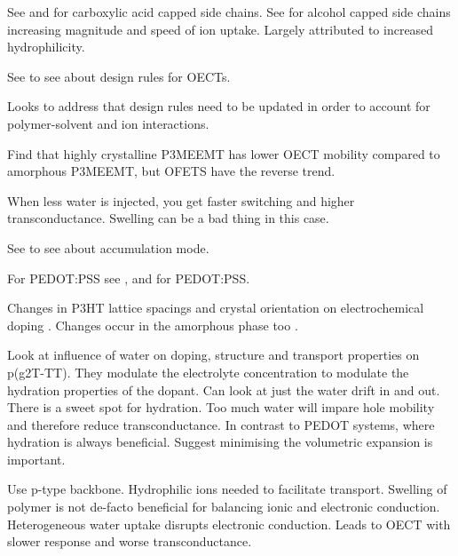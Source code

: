 \documentclass{article}
\begin{document}
See \cite{Laiho2011} and \cite{Toss2014} for carboxylic acid capped side chains.  See \cite{Pacheco-Moreno2017} for alcohol capped side chains increasing magnitude and speed of ion uptake. Largely attributed to increased hydrophilicity. 

See \cite{Paterson2018} to see about design rules for OECTs.

Looks to address that design rules need to be updated in order to account for polymer-solvent and ion interactions. 

Find that highly crystalline P3MEEMT has lower OECT mobility compared to amorphous P3MEEMT, but OFETS have the reverse trend.  





 \vspace{1cm}
{\bf \cite{Savva2019}}

When less water is injected, you get faster switching and higher transconductance. Swelling can be a bad thing in this case. 

See \cite{Inal2014} to see about accumulation mode. 

For PEDOT:PSS see \cite{inal2016optical}, \cite{volkov2017understanding} and \cite{rivnay2016structural} for PEDOT:PSS.

Changes in P3HT lattice spacings and crystal orientation on electrochemical doping \cite{guardado2017structural}.  Changes occur in the amorphous phase too \cite{giridharagopal2017electrochemical}.

Look at influence of water on doping, structure and transport properties on p(g2T-TT).  They modulate the electrolyte concentration to modulate the hydration properties of the dopant.  Can look at just the water drift in and out.  There is a sweet spot for hydration.  Too much water will impare hole mobility and therefore reduce transconductance.  In contrast to PEDOT systems, where hydration is always beneficial.  Suggest minimising the volumetric expansion is important. 





 \vspace{1cm}
{\bf \cite{Savva2020}}

Use p-type backbone.  Hydrophilic ions needed to facilitate transport.  Swelling of polymer is not de-facto beneficial for balancing ionic and electronic conduction.  Heterogeneous water uptake disrupts electronic conduction. Leads to OECT with slower response and worse transconductance. 
\end{document}
